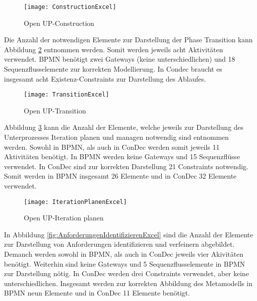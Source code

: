 \begin{figure}[htp]
\begin{center}
  \texttt{[image: ConstructionExcel]} %
  \caption{Open UP-Construction}
  \label{fig:ConstructionExcel}
\end{center}
\end{figure}

Die Anzahl der notwendigen Elemente zur Darstellung der Phase Transition kann Abbildung \ref{fig:TransitionExcel} entnommen werden. Somit werden jeweils acht Aktivitäten verwendet. BPMN benötigt zwei Gateways (keine unterschiedlichen) und 18 Sequenzflusselemente zur korrekten Modellierung. In Condec braucht es insgesamt acht Existenz-Constraints zur Darstellung des Ablaufes.\newline

\begin{figure}[htp]
\begin{center}
  \texttt{[image: TransitionExcel]} %
  \caption{Open UP-Transition}
  \label{fig:TransitionExcel}
\end{center}
\end{figure}



Abbildung \ref{fig:IterationPlanenExcel} kann die Anzahl der Elemente, welche jeweils zur Darstellung des Unterprozesses Iteration planen und managen notwendig sind entnommen werden. Sowohl in BPMN, als auch in ConDec werden somit jeweils 11 Aktivitäten benötigt. In BPMN werden keine Gateways und 15 Sequenzflüsse verwendet. In ConDec sind zur korrekten Darstellung 21 Constraints notwendig. Somit werden in BPMN insgesamt 26 Elemente und in ConDec 32 Elemente verwendet.\newline

\begin{figure}[htp]
\begin{center}
  \texttt{[image: IterationPlanenExcel]} %
  \caption{Open UP-Iteration planen}
  \label{fig:IterationPlanenExcel}
\end{center}
\end{figure}

In Abbildung \ref{fig:AnforderungenIdentifizierenExcel} sind die Anzahl der Elemente zur Darstellung von Anforderungen identifizieren und verfeinern abgebildet. Demanch werden sowohl in BPMN, als auch in ConDec jeweils vier Akivitäten benötigt. Weiterhin sind keine Gateways und 5 Sequenzflusselemente in BPMN zur Darstellung nötig. In ConDec werden drei Constraints verwendet, aber keine unterschiedlichen. Insgesamt werden zur korrekten Abbildung des Metamodells in BPMN neun Elemente und in ConDec 11 Elemente benötigt.\newline

